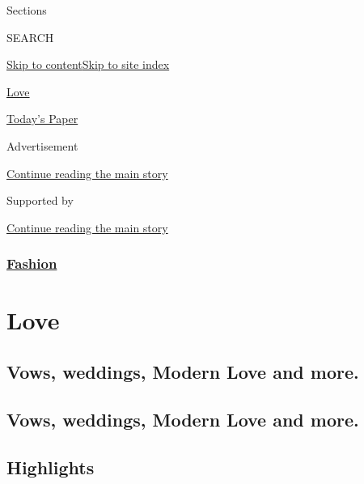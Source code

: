 Sections

SEARCH

\protect\hyperlink{site-content}{Skip to
content}\protect\hyperlink{site-index}{Skip to site index}

\href{https://www.nytimes.com/section/fashion/weddings}{Love}

\href{https://myaccount.nytimes.com/auth/login?response_type=cookie\&client_id=vi}{}

\href{https://www.nytimes.com/section/todayspaper}{Today's Paper}

Advertisement

\protect\hyperlink{after-top}{Continue reading the main story}

Supported by

\protect\hyperlink{after-sponsor}{Continue reading the main story}

\hypertarget{fashion}{%
\subsubsection{\texorpdfstring{\href{/section/fashion}{Fashion}}{Fashion}}\label{fashion}}

\hypertarget{love}{%
\section{Love}\label{love}}

\hypertarget{vows-weddings-modern-love-and-more}{%
\subsection{Vows, weddings, Modern Love and
more.}\label{vows-weddings-modern-love-and-more}}

\hypertarget{vows-weddings-modern-love-and-more-1}{%
\subsection{Vows, weddings, Modern Love and
more.}\label{vows-weddings-modern-love-and-more-1}}

\hypertarget{highlights}{%
\subsection{Highlights}\label{highlights}}


